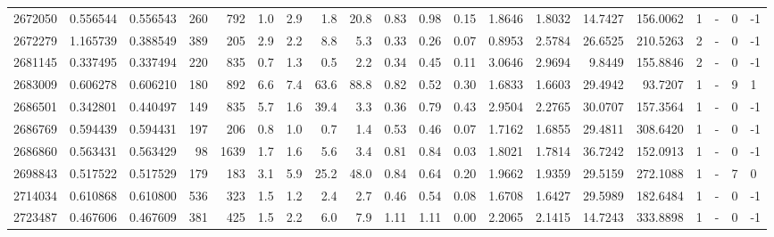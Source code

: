 \begin{tabular}{rrrrrrrrrrrrrrrrrlrl}
   2672050 & 0.556544 &   0.556543 &  260 &  792 &      1.0 &      2.9 &     1.8 &     20.8 &       0.83 &        0.98 &        0.15 &  1.8646 &  1.8032 &   14.7427 &  156.0062 &       1 &             - &        0 &        -1 \\
   2672279 & 1.165739 &   0.388549 &  389 &  205 &      2.9 &      2.2 &     8.8 &      5.3 &       0.33 &        0.26 &        0.07 &  0.8953 &  2.5784 &   26.6525 &  210.5263 &       2 &             - &        0 &        -1 \\
   2681145 & 0.337495 &   0.337494 &  220 &  835 &      0.7 &      1.3 &     0.5 &      2.2 &       0.34 &        0.45 &        0.11 &  3.0646 &  2.9694 &    9.8449 &  155.8846 &       2 &             - &        0 &        -1 \\
   2683009 & 0.606278 &   0.606210 &  180 &  892 &      6.6 &      7.4 &    63.6 &     88.8 &       0.82 &        0.52 &        0.30 &  1.6833 &  1.6603 &   29.4942 &   93.7207 &       1 &             - &        9 &         1 \\
   2686501 & 0.342801 &   0.440497 &  149 &  835 &      5.7 &      1.6 &    39.4 &      3.3 &       0.36 &        0.79 &        0.43 &  2.9504 &  2.2765 &   30.0707 &  157.3564 &       1 &             - &        0 &        -1 \\
   2686769 & 0.594439 &   0.594431 &  197 &  206 &      0.8 &      1.0 &     0.7 &      1.4 &       0.53 &        0.46 &        0.07 &  1.7162 &  1.6855 &   29.4811 &  308.6420 &       1 &             - &        0 &        -1 \\
   2686860 & 0.563431 &   0.563429 &   98 & 1639 &      1.7 &      1.6 &     5.6 &      3.4 &       0.81 &        0.84 &        0.03 &  1.8021 &  1.7814 &   36.7242 &  152.0913 &       1 &             - &        0 &        -1 \\
   2698843 & 0.517522 &   0.517529 &  179 &  183 &      3.1 &      5.9 &    25.2 &     48.0 &       0.84 &        0.64 &        0.20 &  1.9662 &  1.9359 &   29.5159 &  272.1088 &       1 &             - &        7 &         0 \\
   2714034 & 0.610868 &   0.610800 &  536 &  323 &      1.5 &      1.2 &     2.4 &      2.7 &       0.46 &        0.54 &        0.08 &  1.6708 &  1.6427 &   29.5989 &  182.6484 &       1 &             - &        0 &        -1 \\
   2723487 & 0.467606 &   0.467609 &  381 &  425 &      1.5 &      2.2 &     6.0 &      7.9 &       1.11 &        1.11 &        0.00 &  2.2065 &  2.1415 &   14.7243 &  333.8898 &       1 &             - &        0 &        -1 \\

\end{tabular}
